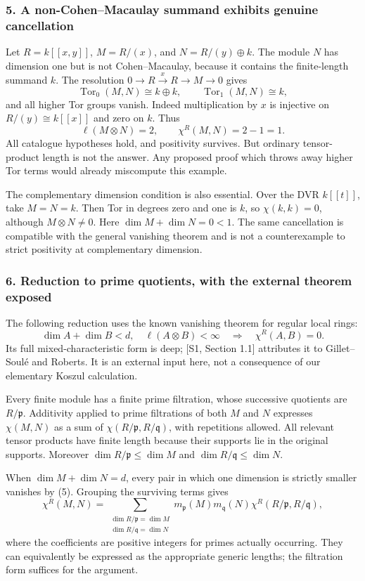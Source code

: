 \documentclass[11pt]{article}
\begin{document}
\subsubsection{5. A non-Cohen--Macaulay summand exhibits genuine cancellation}
Let $R=k[[x,y]]$, $M=R/(x)$, and
$N=R/(y)\oplus k$. The module $N$ has dimension one but is not Cohen--Macaulay, because it contains the finite-length summand $k$. The resolution
$0\to R\xrightarrow{x}R\to M\to0$ gives
\[
 \operatorname{Tor}_0(M,N)\cong k\oplus k,\qquad
 \operatorname{Tor}_1(M,N)\cong k,
\]
and all higher Tor groups vanish. Indeed multiplication by $x$ is injective on $R/(y)\cong k[[x]]$ and zero on $k$. Thus
\[
 \ell(M\otimes N)=2,\qquad \chi^R(M,N)=2-1=1.          \tag{4}
\]
All catalogue hypotheses hold, and positivity survives. But ordinary tensor-product length is not the answer. Any proposed proof which throws away higher Tor terms would already miscompute this example.

The complementary dimension condition is also essential. Over the DVR $k[[t]]$, take $M=N=k$. Then Tor in degrees zero and one is $k$, so $\chi(k,k)=0$, although $M\otimes N\ne0$. Here $\dim M+\dim N=0<1$. The same cancellation is compatible with the general vanishing theorem and is not a counterexample to strict positivity at complementary dimension.

\subsubsection{6. Reduction to prime quotients, with the external theorem exposed}
The following reduction uses the known vanishing theorem for regular local rings:
\[
 \dim A+\dim B<d,\quad\ell(A\otimes B)<\infty
 \quad\Longrightarrow\quad\chi^R(A,B)=0.              \tag{5}
\]
Its full mixed-characteristic form is deep; [S1, Section 1.1] attributes it to Gillet--Soul\'e and Roberts. It is an external input here, not a consequence of our elementary Koszul calculation.

Every finite module has a finite prime filtration, whose successive quotients are $R/\mathfrak p$. Additivity applied to prime filtrations of both $M$ and $N$ expresses $\chi(M,N)$ as a sum of $\chi(R/\mathfrak p,R/\mathfrak q)$, with repetitions allowed. All relevant tensor products have finite length because their supports lie in the original supports. Moreover
$\dim R/\mathfrak p\le\dim M$ and
$\dim R/\mathfrak q\le\dim N$.

When $\dim M+\dim N=d$, every pair in which one dimension is strictly smaller vanishes by (5). Grouping the surviving terms gives
\[
 \chi^R(M,N)=
 \sum_{\substack{\dim R/\mathfrak p=\dim M\\
                  \dim R/\mathfrak q=\dim N}}
 m_{\mathfrak p}(M)m_{\mathfrak q}(N)
 \chi^R(R/\mathfrak p,R/\mathfrak q),                 \tag{6}
\]
where the coefficients are positive integers for primes actually occurring. They can equivalently be expressed as the appropriate generic lengths; the filtration form suffices for the argument.
\end{document}
